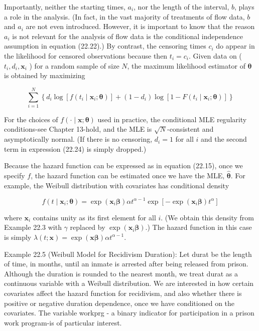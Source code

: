 \documentclass[10pt]{article}
\begin{document}
Importantly, neither the starting times, $a_{i}$, nor the length of the interval, $b$, plays a role in the analysis. (In fact, in the vast majority of treatments of flow data, $b$ and $a_{i}$ are not even introduced. However, it is important to know that the reason $a_{i}$ is not relevant for the analysis of flow data is the conditional independence assumption in equation (22.22).) By contrast, the censoring times $c_{i}$ do appear in the likelihood for censored observations because then $t_{i}=c_{i}$. Given data on ( $t_{i}, d_{i}, \mathbf{x}_{i}$ ) for a random sample of size $N$, the maximum likelihood estimator of $\boldsymbol{\theta}$ is obtained by maximizing


\begin{equation*}
\sum_{i=1}^{N}\left\{d_{i} \log \left[f\left(t_{i} \mid \mathbf{x}_{i} ; \boldsymbol{\theta}\right)\right]+\left(1-d_{i}\right) \log \left[1-F\left(t_{i} \mid \mathbf{x}_{i} ; \boldsymbol{\theta}\right)\right]\right\} \tag{22.24}
\end{equation*}


For the choices of $f(\cdot \mid \mathbf{x} ; \boldsymbol{\theta})$ used in practice, the conditional MLE regularity conditions-see Chapter 13-hold, and the MLE is $\sqrt{N}$-consistent and asymptotically normal. (If there is no censoring, $d_{i}=1$ for all $i$ and the second term in expression (22.24) is simply dropped.)

Because the hazard function can be expressed as in equation (22.15), once we specify $f$, the hazard function can be estimated once we have the MLE, $\hat{\boldsymbol{\theta}}$. For example, the Weibull distribution with covariates has conditional density


\begin{equation*}
f\left(t \mid \mathbf{x}_{i} ; \boldsymbol{\theta}\right)=\exp \left(\mathbf{x}_{i} \boldsymbol{\beta}\right) \alpha t^{\alpha-1} \exp \left[-\exp \left(\mathbf{x}_{i} \boldsymbol{\beta}\right) t^{\alpha}\right] \tag{22.25}
\end{equation*}


where $\mathbf{x}_{i}$ contains unity as its first element for all $i$. (We obtain this density from Example 22.3 with $\gamma$ replaced by $\exp \left(\mathbf{x}_{i} \boldsymbol{\beta}\right)$.) The hazard function in this case is simply $\lambda(t ; \mathbf{x})=\exp (\mathbf{x} \boldsymbol{\beta}) \alpha t^{\alpha-1}$.

Example 22.5 (Weibull Model for Recidivism Duration): Let durat be the length of time, in months, until an inmate is arrested after being released from prison. Although the duration is rounded to the nearest month, we treat durat as a continuous variable with a Weibull distribution. We are interested in how certain covariates affect the hazard function for recidivism, and also whether there is positive or negative duration dependence, once we have conditioned on the covariates. The variable workprg - a binary indicator for participation in a prison work program-is of particular interest.
\end{document}
